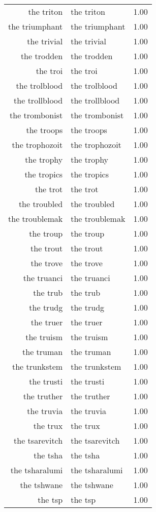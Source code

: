 \begin{table}[ht]
\begin{tabular}{rlr}
  the triton & the triton & 1.00 \\ 
  the triumphant & the triumphant & 1.00 \\ 
  the trivial & the trivial & 1.00 \\ 
  the trodden & the trodden & 1.00 \\ 
  the troi & the troi & 1.00 \\ 
  the trolblood & the trolblood & 1.00 \\ 
  the trollblood & the trollblood & 1.00 \\ 
  the trombonist & the trombonist & 1.00 \\ 
  the troops & the troops & 1.00 \\ 
  the trophozoit & the trophozoit & 1.00 \\ 
  the trophy & the trophy & 1.00 \\ 
  the tropics & the tropics & 1.00 \\ 
  the trot & the trot & 1.00 \\ 
  the troubled & the troubled & 1.00 \\ 
  the troublemak & the troublemak & 1.00 \\ 
  the troup & the troup & 1.00 \\ 
  the trout & the trout & 1.00 \\ 
  the trove & the trove & 1.00 \\ 
  the truanci & the truanci & 1.00 \\ 
  the trub & the trub & 1.00 \\ 
  the trudg & the trudg & 1.00 \\ 
  the truer & the truer & 1.00 \\ 
  the truism & the truism & 1.00 \\ 
  the truman & the truman & 1.00 \\ 
  the trunkstem & the trunkstem & 1.00 \\ 
  the trusti & the trusti & 1.00 \\ 
  the truther & the truther & 1.00 \\ 
  the truvia & the truvia & 1.00 \\ 
  the trux & the trux & 1.00 \\ 
  the tsarevitch & the tsarevitch & 1.00 \\ 
  the tsha & the tsha & 1.00 \\ 
  the tsharalumi & the tsharalumi & 1.00 \\ 
  the tshwane & the tshwane & 1.00 \\ 
  the tsp & the tsp & 1.00 \\ 

\end{tabular}
\end{table}

